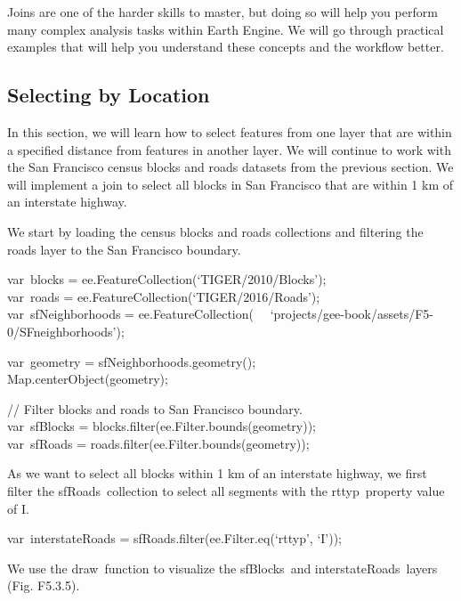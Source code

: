 \documentclass[
  letterpaper,
  DIV=11,
  numbers=noendperiod]{scrreprt}
\begin{document}
Joins are one of the harder skills to master, but doing so will help you
perform many complex analysis tasks within Earth Engine. We will go
through practical examples that will help you understand these concepts
and the workflow better.

\hypertarget{selecting-by-location}{%
\subsection{Selecting by Location}\label{selecting-by-location}}

In this section, we will learn how to select features from one layer
that are within a specified distance from features in another layer. We
will continue to work with the San Francisco census blocks and roads
datasets from the previous section. We will implement a join to select
all blocks in San Francisco that are within 1 km of an interstate
highway.

We start by loading the census blocks and roads collections and
filtering the roads layer to the San Francisco boundary.

var~blocks = ee.FeatureCollection(`TIGER/2010/Blocks');\\
var~roads = ee.FeatureCollection(`TIGER/2016/Roads');\\
var~sfNeighborhoods = ee.FeatureCollection(~
~`projects/gee-book/assets/F5-0/SFneighborhoods');

var~geometry = sfNeighborhoods.geometry();\\
Map.centerObject(geometry);

// Filter blocks and roads to San Francisco boundary.\\
var~sfBlocks = blocks.filter(ee.Filter.bounds(geometry));\\
var~sfRoads = roads.filter(ee.Filter.bounds(geometry));

As we want to select all blocks within 1 km of an interstate highway, we
first filter the sfRoads~collection to select all segments with the
rttyp~property value of I.

var~interstateRoads = sfRoads.filter(ee.Filter.eq(`rttyp', `I'));

We use the draw~function to visualize the sfBlocks~and
interstateRoads~layers (Fig. F5.3.5).
\end{document}
